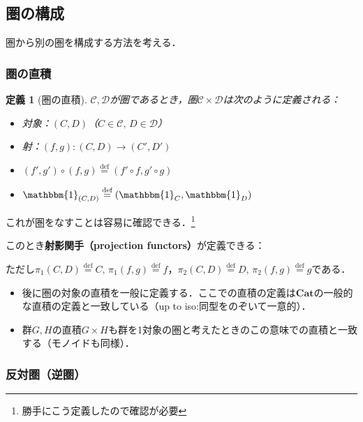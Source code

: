 \documentclass[dvipdfmx,a4j,10pt]{jsarticle}
\theoremstyle{mystyle1}
\theoremstyle{mystyle2}
\newtheorem{dfn*}{定義}
\newcommand*{\defeq}{\stackrel{\text{def}}{=}}
\newcommand{\Cat}{\mathbf{Cat}}
\begin{document}
	\subsection{圏の構成}

	圏から別の圏を構成する方法を考える．

	\subsubsection{圏の直積}

	\begin{dfn*}[圏の直積]
		$\mathcal{C},\mathcal{D}$が圏であるとき，圏$\mathcal{C}\times\mathcal{D}$は次のように定義される：
		\begin{itemize}
			\item 対象：$(C,D)$（$C\in\mathcal{C},\, D\in\mathcal{D}$）
			\item 射：$(f,g):(C,D)\to(C',D')$
			\item $(f',g')\circ(f,g)\defeq(f'\circ f,g'\circ g)$
			\item $\mathbbm{1}_{(C,D)}\defeq(\mathbbm{1}_C,\mathbbm{1}_D)$
		\end{itemize}
	\end{dfn*}

	これが圏をなすことは容易に確認できる．\footnote{勝手にこう定義したので確認が必要}

	このとき\textbf{射影関手（projection functors）}が定義できる：

	\begin{center}
	\end{center}
	ただし$\pi_1(C,D)\defeq C,\, \pi_1(f,g)\defeq f$，$\pi_2(C,D)\defeq D,\, \pi_2(f,g)\defeq g$である．

	\begin{itemize}
		\item 後に圏の対象の直積を一般に定義する．ここでの直積の定義は$\Cat$の一般的な直積の定義と一致している（up to iso:同型をのぞいて一意的）．
		\item 群$G,H$の直積$G\times H$も群を1対象の圏と考えたときのこの意味での直積と一致する（モノイドも同様）．
	\end{itemize}

	\subsubsection{反対圏（逆圏）}
\end{document}
